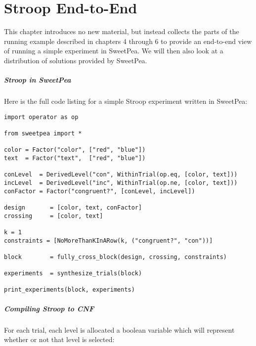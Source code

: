 \chapter{Stroop End-to-End}

This chapter introduces no new material, but instead collects the parts of the running example described in chapters 4 through 6 to provide an end-to-end view of running a simple experiment in SweetPea. We will then also look at a distribution of solutions provided by SweetPea.

\paragraph*{Stroop in SweetPea}

Here is the full code listing for a simple Stroop experiment written in SweetPea:

\begin{verbatim}
import operator as op

from sweetpea import *

color = Factor("color", ["red", "blue"])
text  = Factor("text",  ["red", "blue"])

conLevel  = DerivedLevel("con", WithinTrial(op.eq, [color, text]))
incLevel  = DerivedLevel("inc", WithinTrial(op.ne, [color, text]))
conFactor = Factor("congruent?", [conLevel, incLevel])

design       = [color, text, conFactor]
crossing     = [color, text]

k = 1
constraints = [NoMoreThanKInARow(k, ("congruent?", "con"))]

block        = fully_cross_block(design, crossing, constraints)

experiments  = synthesize_trials(block)

print_experiments(block, experiments)
\end{verbatim}


\paragraph*{Compiling Stroop to CNF}

For each trial, each level is allocated a boolean variable which will represent whether or not that level is selected:


